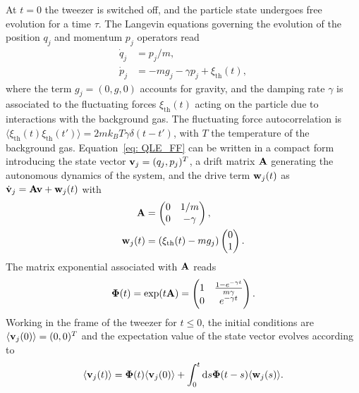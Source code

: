 \documentclass[aps,amssymb,amsmath,prb,superscriptaddress,reprint,notitlepage,onecolumn]{revtex4-1}
\newcommand{\<}{\langle}
\renewcommand{\>}{\rangle}
\begin{document}
At $t=0$ the tweezer is switched off, and the particle state undergoes free evolution for a time $\tau$. The Langevin equations governing the evolution of the position $q_j$ and momentum $p_j$ operators read
%
\begin{equation}\label{eq: QLE_FF}
	\begin{aligned}
		\dot{q}_j&=p_j/m,\\
		\dot{p}_j&=-m g_j-\gamma p_j  + \xi_\text{th}(t),
	\end{aligned}
\end{equation}
%
where the term $g_j=(0,g,0)$ accounts for gravity, and the damping rate $\gamma$ is associated to the  fluctuating forces $\xi_\text{th}(t)$ acting on the particle due to interactions with the background gas.
%
The fluctuating force autocorrelation is $\langle \xi_\text{th}(t) \xi_\text{th}(t')\rangle  = 2 m k_B T \gamma \delta(t-t')$, with $T$ the temperature of the background gas.
%
Equation~\ref{eq: QLE_FF} can be written in a compact form introducing the state vector $\vb{v}_j=(q_j,p_j)^{T}$, a drift matrix $\vb{A}$ generating the autonomous dynamics of the system, and the drive term $\vb{w}_j(t)$ as $\dot{\vb{v}}_j=\vb{A}\vb{v}+\vb{w}_j(t)$ with
%
\begin{equation}
\begin{aligned}
	\vb{A}&=\begin{pmatrix}
		0 & 1/m\\
		0 & -\gamma
	\end{pmatrix},\\
	\vb{w}_j(t)&= (\xi_\text{th}(t)-m g_j)\begin{pmatrix}
		0\\
		1
	\end{pmatrix}.
\end{aligned}
\end{equation}
%
The matrix exponential associated with $\vb{A}$ reads
%
\begin{equation}
	\vb{\Phi}(t)=\exp(t\vb{A})=\begin{pmatrix}
		1 & \frac{1-e^{-\gamma t}}{m\gamma}\\
		0 & e^{-\gamma t}
	\end{pmatrix}
    .
\end{equation}
%
Working in the frame of the tweezer for $t\leq0$, the initial conditions are $\langle \vb{v}_j(0)\rangle=(0,0)^T$ and the expectation value of the state vector evolves according to
%
\begin{equation}\label{eq: ODEsol}
	\langle\vb{v}_j(t)\rangle =\vb{\Phi}(t)\langle \vb{v}_j(0)\rangle+\int_0^t \dd s  \vb{\Phi}(t-s)\langle\vb{w}_j(s)\rangle.
\end{equation} 
\end{document}
